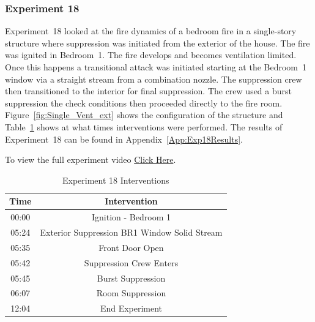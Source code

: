 \documentclass[12pt,oneside]{book}
\begin{document}
\subsubsection{Experiment 18}
Experiment~18 looked at the fire dynamics of a bedroom fire in a single-story structure where suppression was initiated from the exterior of the house. The fire was ignited in Bedroom~1. The fire develops and becomes ventilation limited. Once this happens a transitional attack was initiated starting at the Bedroom~1 window via a straight stream from a combination nozzle.  The suppression crew then transitioned to the interior for final suppression. The crew used a burst suppression the check conditions then proceeded directly to the fire room. Figure~\ref{fig:Single_Vent_ext} shows the configuration of the structure and Table~\ref{Table:Exp18Interventions} shows at what times interventions were performed. The results of Experiment~18 can be found in Appendix~\ref{App:Exp18Results}. 

To view the full experiment video \href{https://player.vimeo.com/video/170499622?autoplay=1}{Click Here}.

\begin{table}[H]
	\centering
	\caption{Experiment 18 Interventions}
	\begin{tabular}{|c|c|} 
		\hline
		Time & Intervention \\ \hline \hline
		00:00 & Ignition - Bedroom 1 \\ \hline
		05:24 & Exterior Suppression BR1 Window Solid Stream \\ \hline
		05:35 & Front Door Open \\ \hline
		05:42 & Suppression Crew Enters\\ \hline
		05:45 & Burst Suppression \\ \hline 
		06:07 & Room Suppression \\ \hline
		12:04 & End Experiment\\ \hline
	\end{tabular}
	\label{Table:Exp18Interventions}
\end{table}

\FloatBarrier
\end{document}
